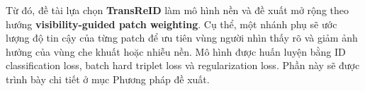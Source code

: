 Từ đó, đề tài lựa chọn \textbf{TransReID}
\cite{he2021transreidtransformerbasedobjectreidentification} làm mô hình nền và
đề xuất mở rộng theo hướng \textbf{visibility-guided patch weighting}. Cụ thể,
một nhánh phụ sẽ ước lượng độ tin cậy của từng patch để ưu tiên vùng người nhìn
thấy rõ và giảm ảnh hưởng của vùng che khuất hoặc nhiễu nền. Mô hình được huấn
luyện bằng ID classification loss, batch hard triplet loss và regularization
loss. Phần này sẽ được trình bày chi tiết ở mục Phương pháp đề xuất.
